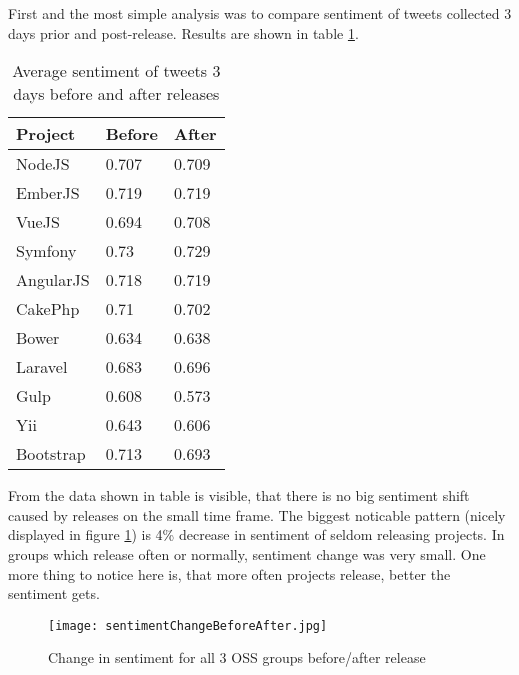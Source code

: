 First and the most simple analysis was to compare sentiment of tweets collected 3 days prior and post-release. Results are shown in table \ref{table:BeforeAfterReleaseSentiment}.

\begin{table}[H]
\centering
\begin{tabular}{ |p{3cm}|p{3cm}|p{3cm}|}
 \hline
\textbf{Project }& \textbf{Before}& \textbf{After}\\
 \hline
 NodeJS   & 0.707 & 0.709\\ \hline
 EmberJS   & 0.719 & 0.719\\ \hline
 VueJS   & 0.694 & 0.708\\ \hline 
 Symfony & 0.73 & 0.729\\ \hline   
 AngularJS   & 0.718 & 0.719\\ \hline
 CakePhp & 0.71 & 0.702\\ \hline 
 Bower   & 0.634 & 0.638\\ \hline 
 Laravel & 0.683 & 0.696\\ \hline
 Gulp & 0.608 & 0.573\\ \hline
 Yii & 0.643 & 0.606\\ \hline
 Bootstrap & 0.713 & 0.693\\ \hline
\end{tabular}
\caption{Average sentiment of tweets 3 days before and after releases}
\label{table:BeforeAfterReleaseSentiment}
\end{table}

From the data shown in table is visible, that there is no big sentiment shift caused by releases on the small time frame. The biggest noticable pattern (nicely displayed in figure \ref{fig:sentimentChangeBeforeAfter}) is 4\% decrease in sentiment of seldom releasing projects. In groups which release often or normally, sentiment change was very small. One more thing to notice here is, that more often projects release, better the sentiment gets.

\begin{figure}[H]%
    \centering
	\texttt{[image: sentimentChangeBeforeAfter.jpg]}
    \caption{Change in sentiment for all 3 OSS groups before/after release}%
    \label{fig:sentimentChangeBeforeAfter}%
\end{figure}
